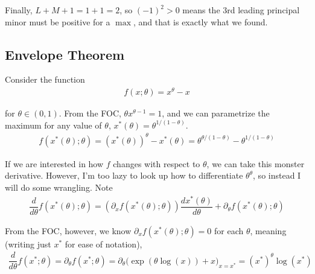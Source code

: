\documentclass{article}
\begin{document}
Finally, $L + M + 1 = 1 + 1 = 2$, so $(-1)^2 > 0$ means the 3rd leading principal minor must be positive for a $\max$, and that is exactly what we found.

\subsection{Envelope Theorem}
\label{sub:envelope_theorem}

Consider the function
\begin{align*}
  f(x; \theta) = x^\theta - x
\end{align*}

for $\theta \in (0, 1)$. From the FOC, $\theta x^{\theta - 1} = 1$, and we can parametrize the maximum for any value of $\theta$, $x^*(\theta) = \theta^{1/(1 - \theta)}$.
\begin{align*}
  f(x^*(\theta); \theta)
  =
  (x^*(\theta))^\theta - x^*(\theta)
  =
  \theta^{\theta /(1 - \theta)}
  -
  \theta^{1 /(1 - \theta)}
\end{align*}

If we are interested in how $f$ changes with respect to $\theta$, we can take this monster derivative. However, I'm too lazy to look up how to differentiate $\theta^\theta$, so instead I will do some wrangling. Note
\begin{align*}
  \dfrac{d}{d\theta}
  f(x^*(\theta); \theta)
  =
  \left(
    \partial_x f(x^*(\theta); \theta)
  \right) \dfrac{d x^*(\theta)}{d \theta}
  +
  \partial_{\theta} f(x^*(\theta); \theta)
\end{align*}

From the FOC, however, we know $\partial_x f(x^*(\theta); \theta) = 0$ for each $\theta$, meaning (writing just $x^*$ for ease of notation),
\begin{align*}
  \dfrac{d}{d\theta} f(x^*; \theta)
  =
  \partial_{\theta} f(x^*; \theta)
  =
  \partial_{\theta}
  \Big(
    \exp(\theta \log(x))
    +
    x
  \Big)_{x = x^*}
  =
  (x^*)^\theta \log(x^*)
\end{align*}
\end{document}
